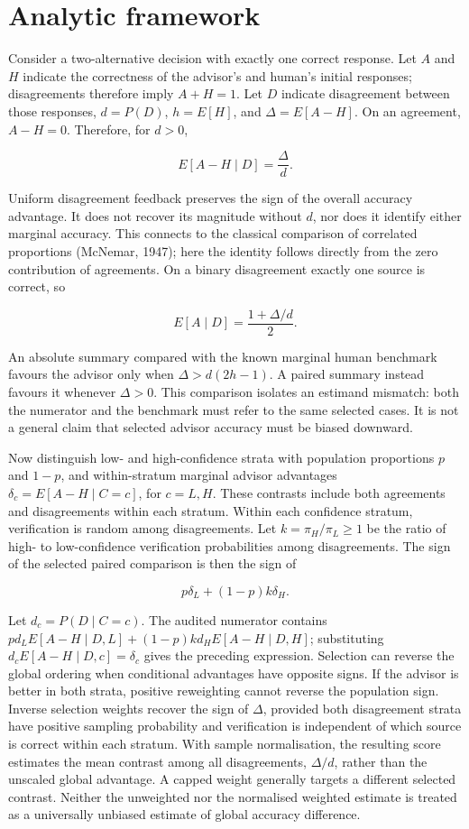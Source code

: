 \documentclass[
  british,
  11pt,
]{article}
\begin{document}
\section{Analytic framework}\label{analytic-framework}

Consider a two-alternative decision with exactly one correct response.
Let \(A\) and \(H\) indicate the correctness of the advisor's and
human's initial responses; disagreements therefore imply \(A+H=1\). Let
\(D\) indicate disagreement between those responses, \(d=P(D)\),
\(h=E[H]\), and \(\Delta=E[A-H]\). On an agreement, \(A-H=0\).
Therefore, for \(d>0\),

\[E[A-H\mid D]=\frac{\Delta}{d}.\]

Uniform disagreement feedback preserves the sign of the overall accuracy
advantage. It does not recover its magnitude without \(d\), nor does it
identify either marginal accuracy. This connects to the classical
comparison of correlated proportions (McNemar, 1947); here the identity
follows directly from the zero contribution of agreements. On a binary
disagreement exactly one source is correct, so

\[E[A\mid D]=\frac{1+\Delta/d}{2}.\]

An absolute summary compared with the known marginal human benchmark
favours the advisor only when \(\Delta>d(2h-1)\). A paired summary
instead favours it whenever \(\Delta>0\). This comparison isolates an
estimand mismatch: both the numerator and the benchmark must refer to
the same selected cases. It is not a general claim that selected advisor
accuracy must be biased downward.

Now distinguish low- and high-confidence strata with population
proportions \(p\) and \(1-p\), and within-stratum marginal advisor
advantages \(\delta_c=E[A-H\mid C=c]\), for \(c=L,H\). These contrasts
include both agreements and disagreements within each stratum. Within
each confidence stratum, verification is random among disagreements. Let
\(k=\pi_H/\pi_L\ge1\) be the ratio of high- to low-confidence
verification probabilities among disagreements. The sign of the selected
paired comparison is then the sign of

\[p\delta_L+(1-p)k\delta_H.\]

Let \(d_c=P(D\mid C=c)\). The audited numerator contains
\(p d_L E[A-H\mid D,L]+(1-p)k d_H E[A-H\mid D,H]\); substituting
\(d_cE[A-H\mid D,c]=\delta_c\) gives the preceding expression. Selection
can reverse the global ordering when conditional advantages have
opposite signs. If the advisor is better in both strata, positive
reweighting cannot reverse the population sign. Inverse selection
weights recover the sign of \(\Delta\), provided both disagreement
strata have positive sampling probability and verification is
independent of which source is correct within each stratum. With sample
normalisation, the resulting score estimates the mean contrast among all
disagreements, \(\Delta/d\), rather than the unscaled global advantage.
A capped weight generally targets a different selected contrast. Neither
the unweighted nor the normalised weighted estimate is treated as a
universally unbiased estimate of global accuracy difference.
\end{document}
